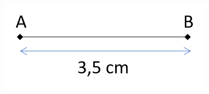 \begin{mydefs}
	\iftoggle{eleve}{%
		La mesure \hrulefill
		
		\vspace*{0.2cm}
		\hrulefill 
		
		La longueur \hrulefill
		
	}{%
	La mesure d'un segment (distance entre ses deux extrémités) est sa \kw{longueur}.
	
	La longueur d'un segment $[AB]$, se note $AB$ ou $BA$. 
}
\end{mydefs}


\begin{myex}
	\vspace*{-0.5cm}
	\begin{center}
		\includegraphics[scale=0.8]{img/lgr}
	\end{center}
	\vspace*{-0.5cm}
	
	\iftoggle{eleve}{%
		La longueur \hrulefill
		\vspace*{0.2cm}
		\hrulefill 
}{%
	La longueur du segment $[AB]$ est de \num{3.5} cm, on note $AB=\num{3.5}$ cm.
}	
	
\end{myex}



